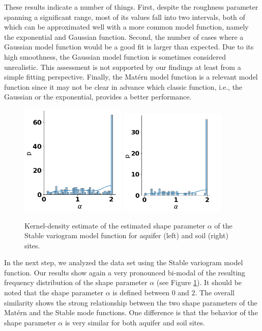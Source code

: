 \documentclass{article}
\begin{document}
These results indicate a number of things. First, despite the roughness parameter spanning a significant range, most of its values fall into two intervals, both of which can be approximated well with a more common model function, namely the exponential and Gaussian function. Second, the number of cases where a Gaussian model function would be a good fit is larger than expected. Due to its high smoothness, the Gaussian model function is sometimes considered unrealistic. This assessment is not supported by our findings at least from a simple fitting perspective. Finally, the Mat{\'e}rn model function is a relevant model function since it may not be clear in advance which classic function, i.e., the Gaussian or the exponential, provides a better performance. 

\begin{figure}[ht]
    \includegraphics[width=0.45\textwidth]{fig/nu_aquifer_stable_kde.png}
    \includegraphics[width=0.45\textwidth]{fig/nu_soil_stable_kde.png}
    \caption{Kernel-density estimate of the estimated shape parameter $\alpha$ of the Stable variogram model function for aquifer (left) and soil (right) sites.}
    \label{fig:nu_stable}
\end{figure}

In the next step, we analyzed the data set using the Stable variogram model function. Our results show again a very pronounced bi-modal of the resulting frequency distribution of the shape parameter $\alpha$ (see Figure \ref{fig:nu_stable}). It should be noted that the shape parameter $\alpha$ is defined between $0$ and $2$. The overall similarity shows the strong relationship between the two shape parameters of the Mat{\'e}rn and the Stable mode functions. One difference is that the behavior of the shape parameter $\alpha$ is very similar for both aquifer and soil sites.
\end{document}
